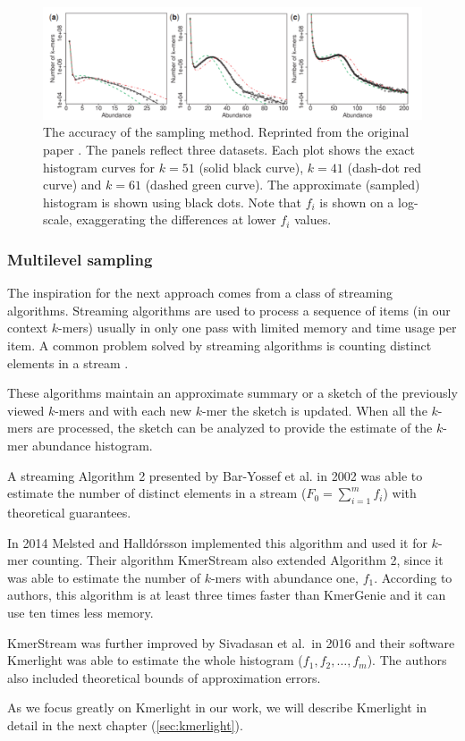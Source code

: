 \begin{figure}
\centerline{\includegraphics[width=1.1\textwidth]{images/kmergenie-sampling-accuracy.pdf}}
\caption[Accuracy of KmerGenie Sampling]{The accuracy of the sampling method. 
Reprinted from the original paper \cite{Chikhi2013}. 
The panels reflect three datasets. Each plot shows the exact
histogram curves for $k=51$ (solid black curve), $k=41$ (dash-dot red curve) 
and $k=61$ (dashed green curve). The approximate (sampled) histogram is
shown using black dots. Note that $f_i$ is shown on a log-scale, 
exaggerating the differences at lower $f_i$ values.}
\label{img:kmergenie-sampling-accuracy}
\end{figure}

\subsubsection{Multilevel sampling}
The inspiration for the next approach comes from a class of streaming algorithms.
Streaming algorithms are used to process a sequence of items (in our context $k$-mers) usually 
in only one pass with limited memory and time usage per item. A common problem solved by
streaming algorithms is counting distinct elements in a stream \cite{WikiStreamingAlg}.

These algorithms maintain an approximate summary or a sketch of the previously viewed
$k$-mers and with each new $k$-mer the sketch is updated. When all the $k$-mers are processed,
the sketch can be analyzed to provide the estimate of the $k$-mer abundance histogram.

\medskip

A streaming Algorithm 2 presented by Bar-Yossef et al. in 2002 \cite{Bar-Yossef2002} was
able to estimate the number of distinct elements in a stream ($F_0 = \sum_{i=1}^{m} f_i$)
with theoretical guarantees. 

In 2014 Melsted and Halldórsson \cite{Melsted2014} implemented this algorithm and used it for
$k$-mer counting. Their algorithm KmerStream also extended Algorithm 2, since it was able
to estimate the number of $k$-mers with abundance one, $f_1$. According to authors, this
algorithm is at least three times faster than KmerGenie and it can use ten times less memory.

KmerStream was further improved by Sivadasan et al.\ in 2016 \cite{Sivadasan2016}
and their software Kmerlight was able to estimate the whole histogram ($f_1, f_2, \dots , f_m$).
The authors also included theoretical bounds of approximation errors.

As we focus greatly on Kmerlight in our work, we will describe Kmerlight in detail 
in the next chapter (\ref{sec:kmerlight}).
